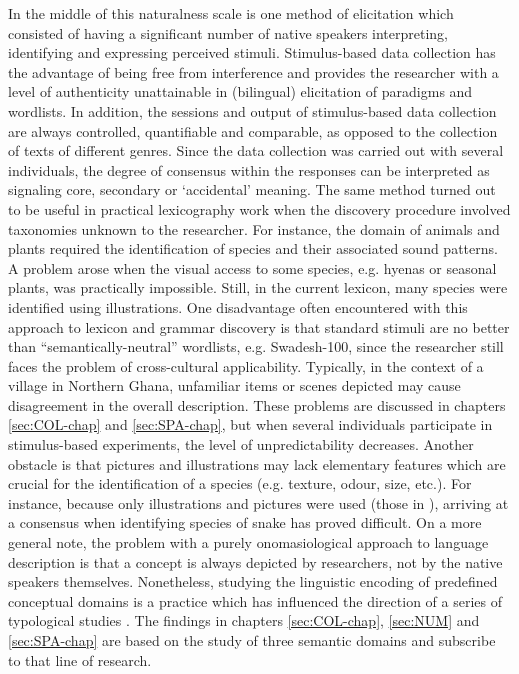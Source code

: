 In the middle of this naturalness scale is one method of elicitation  which 
consisted of having a significant number of native speakers interpreting,
identifying and expressing perceived stimuli.  Stimulus-based data collection
has the advantage of being free from interference and provides the researcher
with a level of authenticity unattainable in (bilingual) elicitation of
paradigms
and wordlists.  In addition, the sessions and output of stimulus-based data
collection are always  controlled, quantifiable and comparable, as opposed to
the
collection of texts of different genres. Since the data collection was carried
out with several individuals, the degree of consensus within the responses can
be interpreted as signaling core, secondary or `accidental'
meaning. The same method  turned out to be useful in practical lexicography work
when the discovery procedure involved  taxonomies unknown to the researcher. For
instance, the domain of animals and plants required the identification of
species and their associated sound patterns. A problem arose when the visual
access to some species, e.g.   hyenas or seasonal plants,  was practically
impossible. Still, in the current lexicon, many species were identified using
illustrations. One disadvantage often encountered with this approach to lexicon
and
grammar discovery is that standard stimuli are no better than 
``semantically-neutral'' wordlists, e.g. Swadesh-100, since the researcher
still faces
the problem  of cross-cultural applicability.  Typically, in the context of a
village in Northern Ghana, unfamiliar items or scenes depicted may cause
disagreement in
the overall description.  These
problems are discussed in chapters \ref{sec:COL-chap} and \ref{sec:SPA-chap},
but when several individuals participate in  stimulus-based
experiments, the level of unpredictability  decreases.
Another obstacle is that pictures and illustrations may lack 
elementary features
which are crucial for
 the identification of a species (e.g. texture, odour, size, etc.). For
instance,
because  only  illustrations and pictures were used (those in \cite{Cans61,
Trap06}),  arriving at a consensus when identifying  species
of snake has proved difficult. On a more general note,  the problem with a
purely onomasiological
approach to language
description is that a concept is always depicted by   researchers, not by
the native speakers themselves. Nonetheless, studying the linguistic encoding of
predefined conceptual domains is a practice which has influenced the direction
of  a series of typological studies \cite[among others,][]{Berl69, Levi03,
Hasp03, Bohn07a, Vanh08a}. The findings in chapters \ref{sec:COL-chap},
\ref{sec:NUM} and \ref{sec:SPA-chap} are based on the study of three semantic
domains and subscribe to that line of research. 


